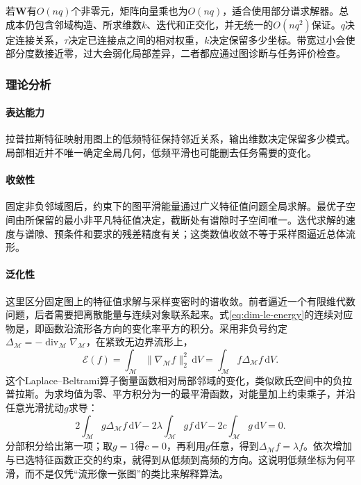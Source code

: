 若$\bm{W}$有$O(nq)$个非零元，矩阵向量乘也为$O(nq)$，适合使用部分谱求解器。总成本仍包含邻域构造、所求维数$k$、迭代和正交化，并无统一的$O(nq^2)$保证。$q$决定连接关系，$\tau$决定已连接点之间的相对权重，$k$决定保留多少坐标。带宽过小会使部分度数接近零，过大会弱化局部差异，二者都应通过图诊断与任务评价检查。

\subsubsection{理论分析}
\label{sec:dim-le-theory}

\paragraph{表达能力}
拉普拉斯特征映射用图上的低频特征保持邻近关系，输出维数决定保留多少模式。局部相近并不唯一确定全局几何，低频平滑也可能删去任务需要的变化。

\paragraph{收敛性}
固定非负邻域图后，约束下的图平滑能量通过广义特征值问题全局求解。最优子空间由所保留的最小非平凡特征值决定，截断处有谱隙时子空间唯一。迭代求解的速度与谱隙、预条件和要求的残差精度有关；这类数值收敛不等于采样图逼近总体流形。

\paragraph{泛化性}
这里区分固定图上的特征值求解与采样变密时的谱收敛。前者逼近一个有限维代数问题，后者需要把离散能量与连续对象联系起来。式\eqref{eq:dim-le-energy}的连续对应物是，即函数沿流形各方向的变化率平方的积分。采用非负号约定$\Delta_{\mathcal{M}}=-\operatorname{div}_{\mathcal{M}}\nabla_{\mathcal{M}}$，在紧致无边界流形上，
\begin{equation}
  \label{eq:dim-dirichlet}
  \mathcal{E}(f)
  =\int_{\mathcal{M}}\lVert\nabla_{\mathcal{M}}f\rVert_2^2\,\mathrm{d}V
  =\int_{\mathcal{M}}f\Delta_{\mathcal{M}}f\,\mathrm{d}V.
\end{equation}
这个Laplace--Beltrami算子衡量函数相对局部邻域的变化，类似欧氏空间中的负拉普拉斯。为求均值为零、平方积分为一的最平滑函数，对能量加上约束乘子，并沿任意光滑扰动$g$求导：
\[
  2\int_{\mathcal{M}}g\Delta_{\mathcal{M}}f\,\mathrm{d}V
  -2\lambda\int_{\mathcal{M}}gf\,\mathrm{d}V
  -2c\int_{\mathcal{M}}g\,\mathrm{d}V=0.
\]
分部积分给出第一项；取$g=1$得$c=0$，再利用$g$任意，得到$\Delta_{\mathcal{M}}f=\lambda f$。依次增加与已选特征函数正交的约束，就得到从低频到高频的方向。这说明低频坐标为何平滑，而不是仅凭“流形像一张图”的类比来解释算法。

